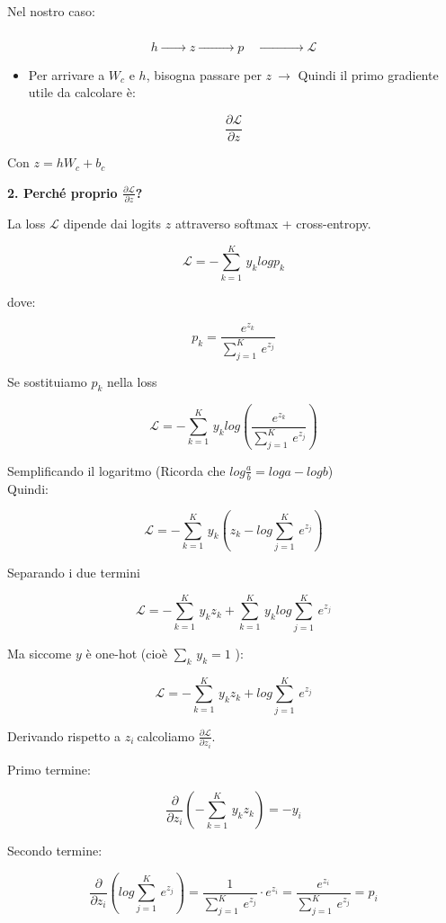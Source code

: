 \documentclass[
  11pt,
]{article}
\begin{document}
Nel nostro caso:

\[h\overset{\phantom{W_{c},b_{c}\ }}{\rightarrow}z\overset{\phantom{\text{ softmax}\ }}{\rightarrow}p\overset{\phantom{\text{ cross-entropy}\ }}{\rightarrow}\mathcal{L}\]

\begin{itemize}
\item
  Per arrivare a \(W_{c}\) e \(h\), bisogna passare per
  \(z\  \rightarrow\) Quindi il primo gradiente utile da calcolare è:
\end{itemize}


\[\frac{\partial\mathcal{L}}{\partial z}\]

Con \(z = hW_{c} + b_{c}\)


\textbf{2. Perché proprio $\frac{\partial\mathcal{L}}{\partial z}$?}


La loss $\mathcal{L}$ dipende dai logits $z$ attraverso softmax + cross-entropy.


\[\mathcal{L} = - \sum_{k = 1}^{K}\, y_{k}logp_{k}\]

dove:

\[p_{k} = \frac{e^{z_{k}}}{\sum_{j = 1}^{K}\, e^{z_{j}}}\]


Se sostituiamo \(p_{k}\) nella loss


\[\mathcal{L} = - \sum_{k = 1}^{K}\, y_{k}log\left( \frac{e^{z_{k}}}{\sum_{j = 1}^{K}\, e^{z_{j}}} \right)\]


Semplificando il logaritmo (Ricorda che
\(log\frac{a}{b} = loga - logb\))\\
Quindi:


\[\mathcal{L} = - \sum_{k = 1}^{K}\, y_{k}\left( z_{k} - log\sum_{j = 1}^{K}\, e^{z_{j}} \right)\]


Separando i due termini


\[\mathcal{L} = - \sum_{k = 1}^{K}\, y_{k}z_{k} + \sum_{k = 1}^{K}\, y_{k}log\sum_{j = 1}^{K}\, e^{z_{j}}\]

Ma siccome \(y\) è one-hot (cioè \(\sum_{k}^{}\, y_{k} = 1\)
):

\[\mathcal{L} = - \sum_{k = 1}^{K}\, y_{k}z_{k} + log\sum_{j = 1}^{K}\, e^{z_{j}}\]


Derivando rispetto a \(z_{i}\ \)calcoliamo
\(\frac{\partial\mathcal{L}}{\partial z_{i}}\).


Primo termine:


\[\frac{\partial}{\partial z_{i}}\left( - \sum_{k = 1}^{K}\, y_{k}z_{k} \right) = - y_{i}\]


Secondo termine:

\[\frac{\partial}{\partial z_{i}}\left( log\sum_{j = 1}^{K}\, e^{z_{j}} \right) = \frac{1}{\sum_{j = 1}^{K}\, e^{z_{j}}} \cdot e^{z_{i}} = \frac{e^{z_{i}}}{\sum_{j = 1}^{K}\, e^{z_{j}}} = p_{i}\]
\end{document}
